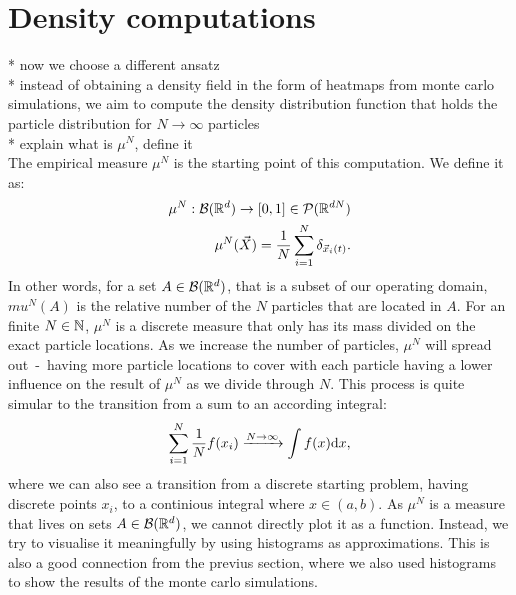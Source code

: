 \section{Density computations}
* now we choose a different ansatz \\
* instead of obtaining a density field in the form of heatmaps from monte carlo simulations, we aim to compute the density distribution function that holds the particle distribution for $N \rightarrow \infty$ particles \\
* explain what is $\mu^N$, define it \\
The empirical measure $\mu^N$ is the starting point of this computation. 
We define it as:  
\begin{align*}
    \mu^{N}: \mathcal{B}(\mathbb{R}^d) \rightarrow [0,1] \in \mathcal{P}(\mathbb{R}^{dN}) \\
    \mu^{N}(\vec{X}) = \frac{1}{N} \sum\limits_{i=1}^{N} \delta_{\vec{x}_i(t)}.
\end{align*}
In other words, for a set $A \in \mathcal{B}(\mathbb{R}^d)$, that is a subset of our operating domain, $mu^{N}(A)$ is the relative number of the $N$ particles that are located in $A$. 
For an finite $N \in \mathbb{N}$, $\mu^{N}$ is a discrete measure that only has its mass divided on the exact particle locations. 
As we increase the number of particles, $\mu^{N}$ will spread out \,-\, having more particle locations to cover with each particle having a lower influence on the result of $\mu^{N}$ as we divide through $N$.
This process is quite simular to the transition from a sum to an according integral:
\[ \sum\limits_{i=1}^{N} \frac{1}{N} f(x_i) \xrightarrow{N \to \infty} \int f(x) \mathrm{d} x,  \]
where we can also see a transition from a discrete starting problem, having discrete points ${x_i}$, to a continious integral where $x \in (a,b)$. 
As $\mu^N$ is a measure that lives on sets $A \in \mathcal{B}(\mathbb{R}^d)$, we cannot directly plot it as a function. 
Instead, we try to visualise it meaningfully by using histograms as approximations.
This is also a good connection from the previus section, where we also used histograms to show the results of the monte carlo simulations. 

